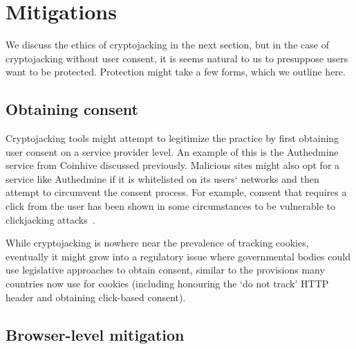 
\section{Mitigations}

We discuss the ethics of cryptojacking in the next section, but in the case of cryptojacking without user consent, it is seems natural to us to presuppose users want to be protected. Protection might take a few forms, which we outline here.

\subsection{Obtaining consent}

Cryptojacking tools might attempt to legitimize the practice by first obtaining user consent on a service provider level. An example of this is the Authedmine service from Coinhive discussed previously. Malicious sites might also opt for a service like Authedmine if it is whitelisted on its users` networks and then attempt to circumvent the consent process. For example, consent that requires a click from the user has been shown in some circumstances to be vulnerable to clickjacking attacks~\cite{rydstedt2010busting}.

While cryptojacking is nowhere near the prevalence of tracking cookies, eventually it might grow into a regulatory issue where governmental bodies could use legislative approaches to obtain consent, similar to the provisions many countries now use for cookies (including honouring the `do not track' HTTP header and obtaining click-based consent).


\subsection{Browser-level mitigation}

